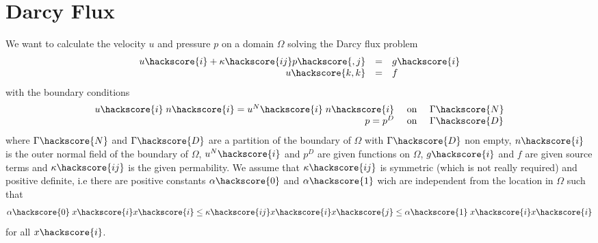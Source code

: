 \section{Darcy Flux}
We want to calculate the velocity $u$ and pressure $p$ on a domain $\Omega$ solving 
the Darcy flux problem 
\begin{equation}\label{DARCY PROBLEM}
\begin{array}{rcl}
u\hackscore{i} + \kappa\hackscore{ij} p\hackscore{,j} & = & g\hackscore{i} \\
u\hackscore{k,k} & = & f
\end{array}
\end{equation} 
with the boundary conditions
\begin{equation}\label{DARCY BOUNDARY}
\begin{array}{rcl}
u\hackscore{i} \; n\hackscore{i}  = u^{N}\hackscore{i}  \; n\hackscore{i} & \mbox{ on } & \Gamma\hackscore{N} \\
p = p^{D} &  \mbox{ on } & \Gamma\hackscore{D} \\ 
\end{array}
\end{equation} 
where $\Gamma\hackscore{N}$ and $\Gamma\hackscore{D}$ are a partition of the boundary of $\Omega$ with $\Gamma\hackscore{D}$ non empty, $n\hackscore{i}$ is the outer normal field of the boundary of $\Omega$, $u^{N}\hackscore{i}$ and $p^{D}$ are given functions on $\Omega$, $g\hackscore{i}$ and $f$ are given source terms and $\kappa\hackscore{ij}$ is the given permability. We assume that $\kappa\hackscore{ij}$ is symmetric (which is not really required) and positive definite, i.e there are positive constants $\alpha\hackscore{0}$ and $\alpha\hackscore{1}$ wich are independent from the location in $\Omega$ such that
\begin{equation}
\alpha\hackscore{0} \; x\hackscore{i} x\hackscore{i} \le \kappa\hackscore{ij} x\hackscore{i} x\hackscore{j} \le \alpha\hackscore{1} \; x\hackscore{i} x\hackscore{i}
\end{equation}
for all $x\hackscore{i}$. 



